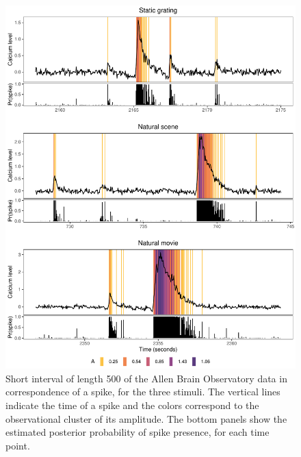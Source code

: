 \begin{figure}
	\centerline{\includegraphics[width = .75\linewidth]{_Images/ch3_spike_color_prob_new.pdf}}
	\caption{Short interval of length 500 of the Allen Brain Observatory data in correspondence of a spike, for the three stimuli. The vertical lines indicate the time of a spike and the colors correspond to the observational cluster of its amplitude. The bottom panels show the estimated posterior probability of spike presence, for each time point.}
	\label{fig:spike_color}
\end{figure}



















